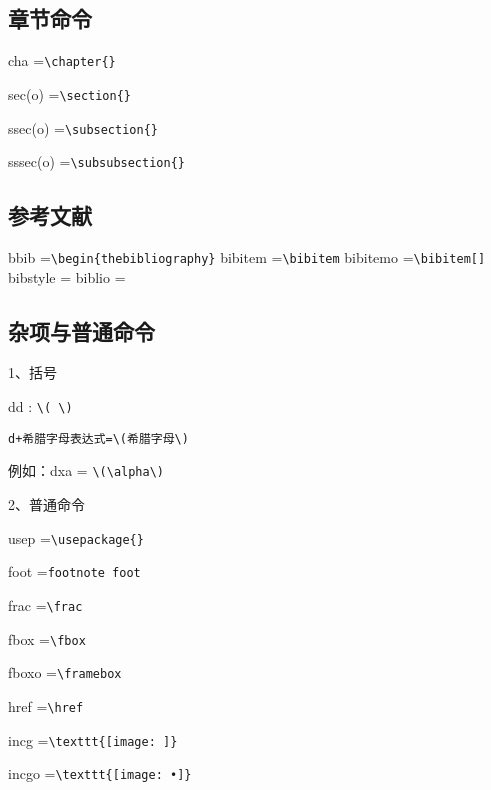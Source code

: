  
 
 \subsection{章节命令}
cha     =\verb|\chapter{}|

sec(o)   =\verb|\section{}|

ssec(o)  =\verb|\subsection{}|

sssec(o) =\verb|\subsubsection{}|

 
\subsection{参考文献}
bbib      =\verb|\begin{thebibliography}|
bibitem   =\verb|\bibitem|
bibitemo  =\verb|\bibitem[]|
bibstyle   =\verb||
biblio     =\verb||
 
  
 \subsection{杂项与普通命令}
1、括号

dd : \verb|\( \)|

\verb|d+希腊字母表达式=\(希腊字母\)|

例如：dxa = \verb|\(\alpha\)|
 
2、普通命令

usep   =\verb|\usepackage{}|

foot    =\verb|footnote foot|

frac    =\verb|\frac|

fbox   =\verb|\fbox|

fboxo  =\verb|\framebox|

href   =\verb|\href|

incg   =\verb|\texttt{[image: ]}|

incgo  =\verb|\texttt{[image: •]}|

